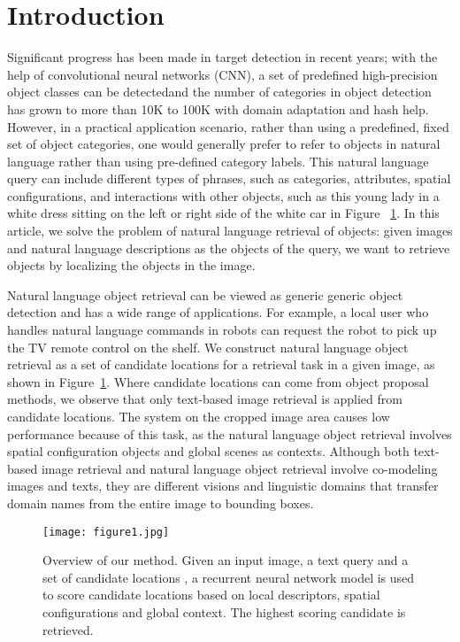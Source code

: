 \documentclass[10pt,twocolumn,letterpaper]{article}
\begin{document}
\section{Introduction}
Significant progress has been made in target detection in recent years; with the help of convolutional neural networks (CNN), a set of predefined high-precision object classes can be detected\cite{Girshick_2014_Rich}and the number of categories in object detection has grown to more than 10K to 100K with domain adaptation and hash help. However, in a practical application scenario, rather than using a predefined, fixed set of object categories, one would generally prefer to refer to objects in natural language rather than using pre-defined category labels. This natural language query can include different types of phrases, such as categories, attributes, spatial configurations, and interactions with other objects, such as this young lady in a white dress sitting on the left or right side of the white car in Figure ~\ref{pic1}. In this article, we solve the problem of natural language retrieval of objects: given images and natural language descriptions as the objects of the query, we want to retrieve objects by localizing the objects in the image.
\par Natural language object retrieval can be viewed as generic generic object detection and has a wide range of applications. For example, a local user who handles natural language commands in robots can request the robot to pick up the TV remote control on the shelf. We construct natural language object retrieval as a set of candidate locations for a retrieval task in a given image, as shown in Figure~\ref{pic1}. Where candidate locations can come from object proposal methods, we observe that only text-based image retrieval is applied from candidate locations. The system on the cropped image area causes low performance because of this task, as the natural language object retrieval involves spatial configuration objects and global scenes as contexts. Although both text-based image retrieval and natural language object retrieval involve co-modeling images and texts, they are different visions and linguistic domains that transfer domain names from the entire image to bounding boxes.
\begin{figure}
	\centering
	\texttt{[image: figure1.jpg]}
	\caption{Overview of our method. Given an input image, a text
		query and a set of candidate locations , a recurrent neural network model is used to score candidate
		locations based on local descriptors, spatial configurations
		and global context. The highest scoring candidate is retrieved.}\label{pic1}
\end{figure}
\end{document}
